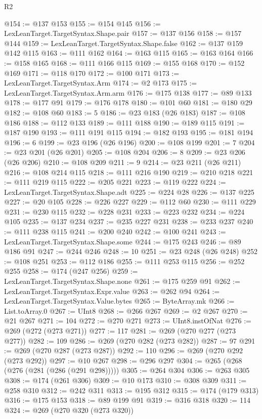 \begin{lexlean}{R2}
\begin{coremodule}
@154 := @137 @153
@155 := @154 @145
@156 := LexLeanTarget.TargetSyntax.Shape.pair
@157 := @137 @156
@158 := @157 @144
@159 := LexLeanTarget.TargetSyntax.Shape.false
@162 := @137 @159 @142 @115
@163 := @111 @162
@164 := @163 @115
@165 := @163 @164
@166 := @158 @165
@168 := @111 @166 @115
@169 := @155 @168
@170 := @152 @169
@171 := @118 @170
@172 := @100 @171
@173 := LexLeanTarget.TargetSyntax.Arm
@174 := @2 @173
@175 := LexLeanTarget.TargetSyntax.Arm.arm
@176 := @175 @138
@177 := @89 @133
@178 := @177 @91
@179 := @176 @178
@180 := @101 @60
@181 := @180 @29
@182 := @108 @60
@183 := 5
@186 := @23 @183 (@26 @183)
@187 := @108 @186
@188 := @112 @133
@189 := @111 @188
@190 := @189 @115
@191 := @187 @190
@193 := @111 @191 @115
@194 := @182 @193
@195 := @181 @194
@196 := 6
@199 := @23 @196 (@26 @196)
@200 := @108 @199
@201 := 7
@204 := @23 @201 (@26 @201)
@205 := @108 @204
@206 := 8
@209 := @23 @206 (@26 @206)
@210 := @108 @209
@211 := 9
@214 := @23 @211 (@26 @211)
@216 := @108 @214 @115
@218 := @111 @216 @190
@219 := @210 @218
@221 := @111 @219 @115
@222 := @205 @221
@223 := @119 @222
@224 := LexLeanTarget.TargetSyntax.Shape.adt
@225 := @224 @28
@226 := @137 @225
@227 := @20 @105
@228 := @226 @227
@229 := @112 @60
@230 := @111 @229
@231 := @230 @115
@232 := @228 @231
@233 := @223 @232
@234 := @224 @105
@235 := @137 @234
@237 := @235 @227 @231
@238 := @233 @237
@240 := @111 @238 @115
@241 := @200 @240
@242 := @100 @241
@243 := LexLeanTarget.TargetSyntax.Shape.some
@244 := @175 @243
@246 := @89 @186 @91
@247 := @244 @246
@248 := 10
@251 := @23 @248 (@26 @248)
@252 := @108 @251
@253 := @112 @186
@255 := @111 @253 @115
@256 := @252 @255
@258 := @174 (@247 @256)
@259 := LexLeanTarget.TargetSyntax.Shape.none
@261 := @175 @259 @91
@262 := LexLeanTarget.TargetSyntax.Expr.value
@263 := @262 @94
@264 := LexLeanTarget.TargetSyntax.Value.bytes
@265 := ByteArray.mk
@266 := List.toArray.{0}
@267 := UInt8
@268 := @266 @267
@269 := @2 @267
@270 := @21 @267
@271 := 104
@272 := @270 @271
@273 := UInt8.instOfNat
@276 := @269 (@272 (@273 @271))
@277 := 117
@281 := @269 (@270 @277 (@273 @277))
@282 := 109
@286 := @269 (@270 @282 (@273 @282))
@287 := 97
@291 := @269 (@270 @287 (@273 @287))
@292 := 110
@296 := @269 (@270 @292 (@273 @292))
@297 := @10 @267
@298 := @296 @297
@304 := @265 (@268 (@276 (@281 (@286 (@291 @298)))))
@305 := @264 @304
@306 := @263 @305
@308 := @174 (@261 @306)
@309 := @10 @173
@310 := @308 @309
@311 := @258 @310
@312 := @242 @311
@313 := @195 @312
@315 := @174 (@179 @313)
@316 := @175 @153
@318 := @89 @199 @91
@319 := @316 @318
@320 := 114
@324 := @269 (@270 @320 (@273 @320))

\end{coremodule}
\end{lexlean}
